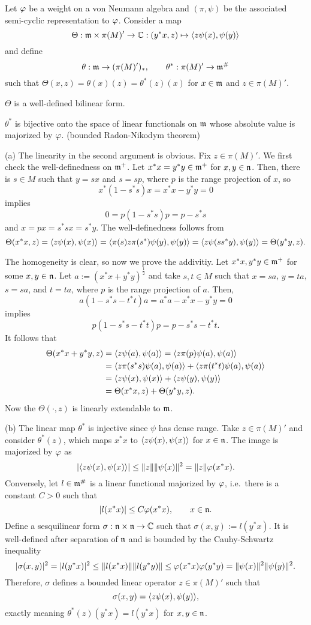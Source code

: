 \documentclass{../../small}
\begin{document}
\begin{prop}
Let $\varphi$ be a weight on a von Neumann algebra and $(\pi,\psi)$ be the associated semi-cyclic representation to $\varphi$.
Consider a map
\[\Theta:\mathfrak{m}\times\pi(M)'\to\mathbb{C}:(y^*x,z)\mapsto\langle z\psi(x),\psi(y)\rangle\]
and define
\[\theta:\mathfrak{m}\to(\pi(M)')_*,\qquad\theta^*:\pi(M)'\to\mathfrak{m}^\#\]
such that $\Theta(x,z)=\theta(x)(z)=\theta^*(z)(x)$ for $x\in\mathfrak{m}$ and $z\in\pi(M)'$.
\begin{parts}
\item $\Theta$ is a well-defined bilinear form.
\item $\theta^*$ is bijective onto the space of linear functionals on $\mathfrak{m}$ whose absolute value is majorized by $\varphi$. (bounded Radon-Nikodym theorem)
\end{parts}
\end{prop}
\begin{pf}
(a)
The linearity in the second argument is obvious.
Fix $z\in\pi(M)'$.
We first check the well-definedness on $\mathfrak{m}^+$.
Let $x^*x=y^*y\in\mathfrak{m}^+$ for $x,y\in\mathfrak{n}$.
Then, there is $s\in M$ such that $y=sx$ and $s=sp$, where $p$ is the range projection of $x$, so
\[x^*(1-s^*s)x=x^*x-y^*y=0\]
implies
\[0=p(1-s^*s)p=p-s^*s\]
and $x=px=s^*sx=s^*y$.
The well-definedness follows from
\[\Theta(x^*x,z)=\langle z\psi(x),\psi(x)\rangle=\langle\pi(s)z\pi(s^*)\psi(y),\psi(y)\rangle=\langle z\psi(ss^*y),\psi(y)\rangle=\Theta(y^*y,z).\]

The homogeneity is clear, so now we prove the addivitiy.
Let $x^*x,y^*y\in\mathfrak{m}^+$ for some $x,y\in\mathfrak{n}$.
Let $a:=(x^*x+y^*y)^{\frac12}$ and take $s,t\in M$ such that $x=sa$, $y=ta$, $s=sa$, and $t=ta$, where $p$ is the range projection of $a$.
Then,
\[a(1-s^*s-t^*t)a=a^*a-x^*x-y^*y=0\]
implies
\[p(1-s^*s-t^*t)p=p-s^*s-t^*t.\]
It follows that
\begin{align*}
\Theta(x^*x+y^*y,z)
&=\langle z\psi(a),\psi(a)\rangle=\langle z\pi(p)\psi(a),\psi(a)\rangle\\
&=\langle z\pi(s^*s)\psi(a),\psi(a)\rangle+\langle z\pi(t^*t)\psi(a),\psi(a)\rangle\\
&=\langle z\psi(x),\psi(x)\rangle+\langle z\psi(y),\psi(y)\rangle\\
&=\Theta(x^*x,z)+\Theta(y^*y,z).
\end{align*}
Now the $\Theta(\cdot,z)$ is linearly extendable to $\mathfrak{m}$.

(b)
The linear map $\theta^*$ is injective since $\psi$ has dense range.
Take $z\in\pi(M)'$ and consider $\theta^*(z)$, which maps $x^*x$ to $\langle z\psi(x),\psi(x)\rangle$ for $x\in\mathfrak{n}$.
The image is majorized by $\varphi$ as
\[|\langle z\psi(x),\psi(x)\rangle|\le\|z\|\|\psi(x)\|^2=\|z\|\varphi(x^*x).\]
Conversely, let $l\in\mathfrak{m}^\#$ is a linear functional majorized by $\varphi$, i.e.~there is a constant $C>0$ such that
\[|l(x^*x)|\le C\varphi(x^*x),\qquad x\in\mathfrak{n}.\]
Define a sesquilinear form $\sigma:\mathfrak{n}\times\mathfrak{n}\to\mathbb{C}$ such that $\sigma(x,y):=l(y^*x)$.
It is well-defined after separation of $\mathfrak{n}$ and is bounded by the Cauhy-Schwartz inequality
\[|\sigma(x,y)|^2=|l(y^*x)|^2\le\|l(x^*x)\|\|l(y^*y)\|\le\varphi(x^*x)\varphi(y^*y)=\|\psi(x)\|^2\|\psi(y)\|^2.\]
Therefore, $\sigma$ defines a bounded linear operator $z\in\pi(M)'$ such that
\[\sigma(x,y)=\langle z\psi(x),\psi(y)\rangle,\]
exactly meaning $\theta^*(z)(y^*x)=l(y^*x)$ for $x,y\in\mathfrak{n}$.
\end{pf}
\end{document}
